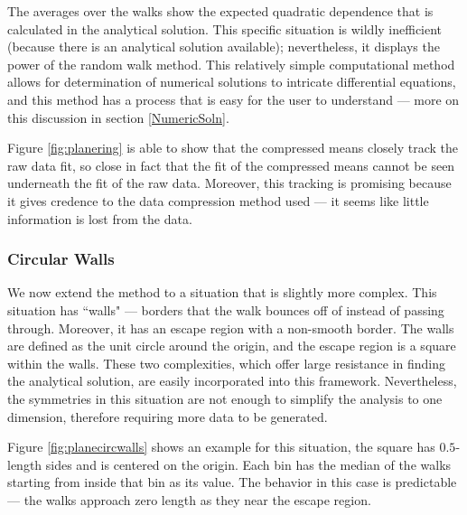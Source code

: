 \documentclass[12pt]{article}
\begin{document}
			The averages over the walks show the expected quadratic dependence that is calculated in the analytical solution.
			This specific situation is wildly inefficient (because there is an analytical solution available); nevertheless, it displays the power of the random walk method.
			This relatively simple computational method allows for determination of numerical solutions to intricate differential equations, and this method has a process that is easy for the user to understand --- more on this discussion in section \ref{NumericSoln}.
			
			Figure \ref{fig:planering} is able to show that the compressed means closely track the raw data fit, so close in fact that the fit of the compressed means cannot be seen underneath the fit of the raw data.
			Moreover, this tracking is promising because it gives credence to the data compression method used --- it seems like little information is lost from the data.
			
		\subsubsection{Circular Walls}
			We now extend the method to a situation that is slightly more complex.
			This situation has ``walls" --- borders that the walk bounces off of instead of passing through.
			Moreover, it has an escape region with a non-smooth border.
			The walls are defined as the unit circle around the origin, and the escape region is a square within the walls.
			These two complexities, which offer large resistance in finding the analytical solution, are easily incorporated into this framework.
			Nevertheless, the symmetries in this situation are not enough to simplify the analysis to one dimension, therefore requiring more data to be generated.
			
			Figure \ref{fig:planecircwalls} shows an example for this situation, the square has $0.5$-length sides and is centered on the origin.
			Each bin has the median of the walks starting from inside that bin as its value.
			The behavior in this case is predictable --- the walks approach zero length as they near the escape region.
			
\end{document}
